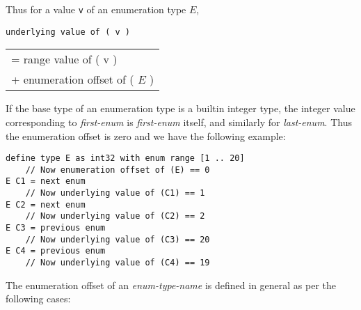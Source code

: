 \documentclass[12pt]{article}
\newenvironment{indpar}[1][0.3in]%
	{\begin{list}{}%
		     {\setlength{\itemsep}{0in}%
		      \setlength{\topsep}{0in}%
		      \setlength{\parsep}{1ex}%
		      \setlength{\labelwidth}{#1}%
		      \setlength{\leftmargin}{#1}%
		      \addtolength{\leftmargin}{\labelsep}}%
	 \item}%
	{\end{list}}
\begin{document}
Thus for a value {\tt v} of an enumeration type $E$,
\begin{center}
\tt underlying value of ( v ) \begin{tabular}[t]{@{}l@{}}
                              = range value of ( v ) \\
			      + enumeration offset of ( $E$ )
			      \end{tabular}
\end{center}

If the base type of an enumeration type is a builtin integer type,
the integer value corresponding to {\em first-enum} is {\em first-enum}
itself, and similarly for {\em last-enum}.  Thus the enumeration offset
is zero and we have the following example:
\begin{indpar}\begin{verbatim}
define type E as int32 with enum range [1 .. 20]
    // Now enumeration offset of (E) == 0
E C1 = next enum
    // Now underlying value of (C1) == 1
E C2 = next enum
    // Now underlying value of (C2) == 2
E C3 = previous enum
    // Now underlying value of (C3) == 20
E C4 = previous enum
    // Now underlying value of (C4) == 19
\end{verbatim}\end{indpar}

The enumeration offset of an {\em enum-type-name} is defined in general
as per the following cases:
\end{document}
